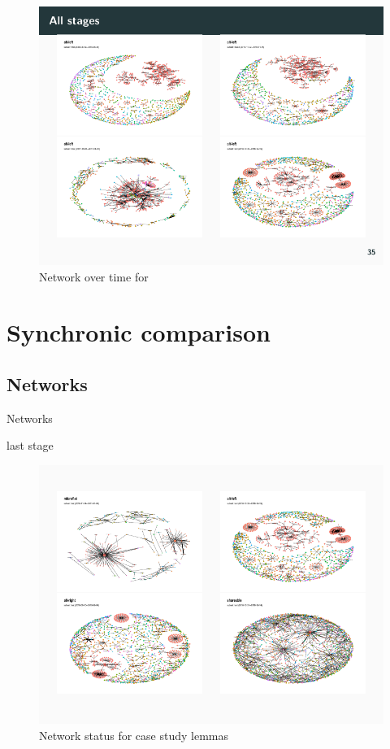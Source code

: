 \documentclass[
  a4paper,
  ]{scrartcl}
\begin{document}
      \begin{figure}[H]
        \centering
        \includegraphics[width=\linewidth, height=.8\textheight, keepaspectratio]{images/net_diac_alt-left.pdf}
        \caption{Network over time for }
      \end{figure}

\section{Synchronic comparison}

  \subsection{Networks}


    Networks

      last stage

        \begin{figure}[H]
          \centering
          \includegraphics[width=\linewidth, height=.8\textheight, keepaspectratio]{images/net_cases_last.pdf}
          \caption{Network status for case study lemmas}
        \end{figure}
\end{document}
